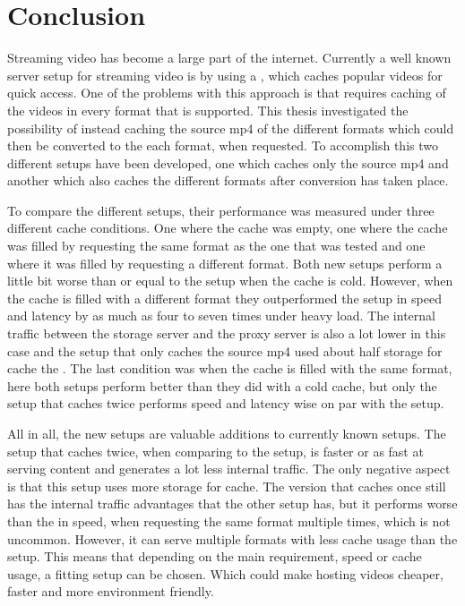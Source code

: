 \documentclass[twoside,openright]{uva-bachelor-thesis}
\begin{document}
\chapter{Conclusion}
Streaming video has become a large part of the internet. Currently a well
known server setup for streaming video is by using a \cdn, which caches popular
videos for quick access. One of the problems with this approach is that requires
caching of the videos in every format that is supported. This thesis
investigated the possibility of instead caching the source mp4 of the different
formats which could then be converted to the each format, when requested.
To accomplish this two different setups have been developed, one which caches
only the source mp4 and another which also caches the different formats after
conversion has taken place.

To compare the different setups, their performance was measured under three
different cache conditions. One where the cache was empty, one where the cache
was filled by requesting the same format as the one that was tested and one
where it was filled by requesting a different format. Both new setups perform a
little bit worse than or equal to the \cdn setup when the cache is cold.
However, when the cache is filled with a different format they outperformed the
\cdn setup in speed and latency by as much as four to seven times under heavy
load. The internal traffic between the storage server and the proxy server is
also a lot lower in this case and the setup that only caches the source mp4 used
about half storage for cache the \cdn. The last condition was when the cache is
filled with the same format, here both setups perform better than they did with
a cold cache, but only the setup that caches twice performs speed and latency
wise on par with the \cdn setup.

All in all, the new setups are valuable additions to currently known setups. The
setup that caches twice, when comparing to the \cdn setup, is faster or as
fast at serving content and generates a lot less internal traffic. The only
negative aspect is that this setup uses more storage for cache. The version that
caches once still has the internal traffic advantages that the other setup has,
but it performs worse than the \cdn in speed, when requesting the same format
multiple times, which is not uncommon. However, it can serve multiple formats
with less cache usage than the \cdn setup. This means that depending on the
main requirement, speed or cache usage, a fitting setup can be chosen. Which
could make hosting videos cheaper, faster and more environment friendly.





\printbibliography[heading=bibintoc]{}

\printglossaries{}
\end{document}
